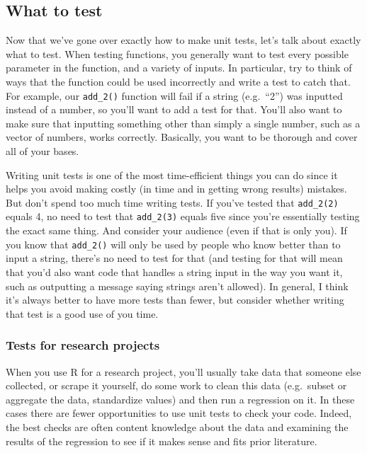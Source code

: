 \documentclass[
  12pt,
]{book}
\begin{document}
\hypertarget{what-to-test}{%
\subsection{What to test}\label{what-to-test}}

Now that we've gone over exactly how to make unit tests, let's talk about exactly what to test. When testing functions, you generally want to test every possible parameter in the function, and a variety of inputs. In particular, try to think of ways that the function could be used incorrectly and write a test to catch that. For example, our \texttt{add\_2()} function will fail if a string (e.g.~``2'') was inputted instead of a number, so you'll want to add a test for that. You'll also want to make sure that inputting something other than simply a single number, such as a vector of numbers, works correctly. Basically, you want to be thorough and cover all of your bases.

Writing unit tests is one of the most time-efficient things you can do since it helps you avoid making costly (in time and in getting wrong results) mistakes. But don't spend too much time writing tests. If you've tested that \texttt{add\_2(2)} equals 4, no need to test that \texttt{add\_2(3)} equals five since you're essentially testing the exact same thing. And consider your audience (even if that is only you). If you know that \texttt{add\_2()} will only be used by people who know better than to input a string, there's no need to test for that (and testing for that will mean that you'd also want code that handles a string input in the way you want it, such as outputting a message saying strings aren't allowed). In general, I think it's always better to have more tests than fewer, but consider whether writing that test is a good use of you time.

\hypertarget{tests-for-research-projects}{%
\subsubsection{Tests for research projects}\label{tests-for-research-projects}}

When you use R for a research project, you'll usually take data that someone else collected, or scrape it yourself, do some work to clean this data (e.g.~subset or aggregate the data, standardize values) and then run a regression on it. In these cases there are fewer opportunities to use unit tests to check your code. Indeed, the best checks are often content knowledge about the data and examining the results of the regression to see if it makes sense and fits prior literature.
\end{document}
